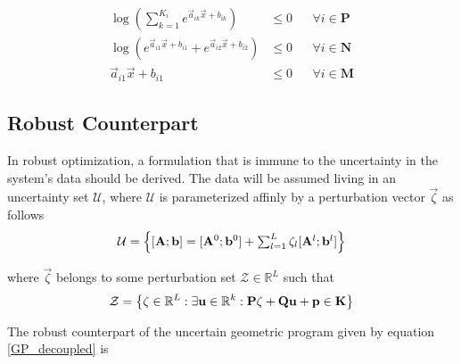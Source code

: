 \begin{equation}
\begin{aligned}
\log(\textstyle{\sum}_{k=1}^{K_i}e^{\vec{a}_{ik}\vec{x} + b_{ik}}) &\leq 0 &&\forall i \in \mathbf{P} \\
\log(e^{\vec{a}_{i1}\vec{x} + b_{i1}} + e^{\vec{a}_{i2}\vec{x} + b_{i2}}) &\leq 0 &&\forall i \in \mathbf{N} \\
\vec{a}_{i1}\vec{x} + b_{i1} &\leq 0 &&\forall i \in \mathbf{M}
\end{aligned}
\label{GP_convex}
\end{equation}
\subsection{Robust Counterpart}
In robust optimization, a formulation that is immune to the uncertainty in the system's data should be derived. The data will be assumed living in an uncertainty set $\mathcal{U}$, where $\mathcal{U}$ is parameterized affinly by a perturbation vector $\vec{\zeta}$ as follows
\begin{equation}
\mathcal{U} = \left\{[\mathbf{A};\mathbf{b}] = [\mathbf{A}^0;\mathbf{b}^0] + \textstyle{\sum_{l=1}^{L}\zeta_l[\mathbf{A}^l;\mathbf{b}^l]}\right\}
\label{Data}
\end{equation}

where $\vec{\zeta}$ belongs to some perturbation set $\mathcal{Z} \in \mathbb{R}^L$ such that
\begin{equation}
\mathcal{Z} = \left\{ \mathbf{\zeta} \in \mathbb{R}^L: \exists \mathbf{u} \in \mathbb{R}^k:\mathbf{P}\mathbf{\zeta} + \mathbf{Q}\mathbf{u} + \mathbf{p} \in \textbf{K} \right\}
\label{perturbation_set}
\end{equation}

The robust counterpart of the uncertain geometric program given by equation \eqref{GP_decoupled} is

